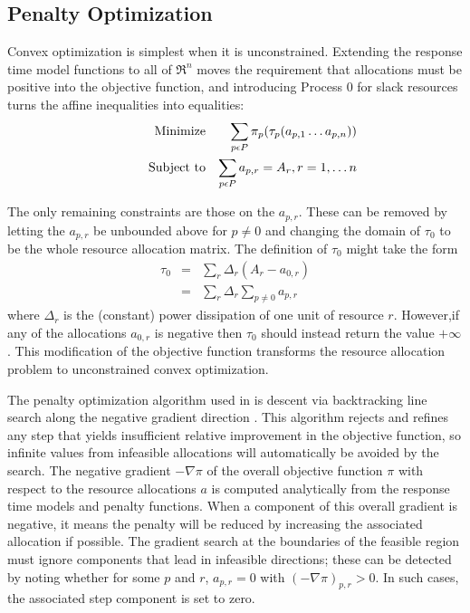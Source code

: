 \subsection*{Penalty Optimization}

Convex optimization is simplest when it is unconstrained.
Extending the response time model functions to all of $\Re^n$
moves the requirement that allocations must be positive into the objective function,
and introducing Process 0 for slack resources turns the affine inequalities into equalities:
\begin{eqnarray*}
& \makebox[1in][r]{Minimize}   & \sum_{p\epsilon P} {\pi_p(\tau_p(a_{p,1}\ldots a_{p,n}))}  \\
& \makebox[1in][r]{Subject to} & \sum_{p\epsilon P} a_{p,r} = A_r, r = 1,\ldots n           \\
\end{eqnarray*}

The only remaining constraints are those on the $a_{p,r}$.
These can be removed by letting the $a_{p,r}$ be unbounded above for $p \neq 0$
and changing the domain of $\tau_0$  to be the whole resource allocation matrix.
The definition of $\tau_0$ might take the form
\begin{eqnarray*}
\tau_0 &=& \sum_r \Delta_r (A_r - a_{0,r})     \\
       &=& \sum_r \Delta_r \sum_{p \neq 0} a_{p,r}
\end{eqnarray*}
where $\Delta_r$ is the (constant) power dissipation of one unit of resource $r$.
However,if any of the allocations $a_{0,r}$ is negative then $\tau_0$  should instead return the value $+\infty$.
This modification of the objective function transforms the resource allocation problem
to unconstrained convex optimization.

The penalty optimization algorithm used in \pacora is descent via backtracking line search along the negative gradient direction \cite{BoVa}.
This algorithm rejects and refines any step that yields insufficient relative improvement in the objective function,
so infinite values from infeasible allocations will automatically be avoided by the search.
The negative gradient $-\nabla\pi$ of the overall objective function $\pi$
with respect to the resource allocations $a$
is computed analytically from the response time models and penalty functions.
When a component of this overall gradient is negative,
it means the penalty will be reduced by increasing the associated allocation if possible.
The gradient search at the boundaries of the feasible region
must ignore components that lead in infeasible directions;
these can be detected by noting whether for some $p$ and $r$, $a_{p,r} = 0$ with $(-\nabla\pi)_{p,r} > 0$.
In such cases, the associated step component is set to zero.

